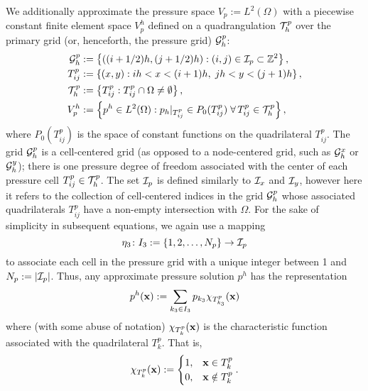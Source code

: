 We additionally approximate the pressure space $V_p := L^2(\Omega)$ with a piecewise constant finite element space $V_p^h$ defined on a quadrangulation $\mathcal{T}^p_h$ over the primary grid (or, henceforth, the pressure grid) $\mathcal{G}^p_h$:
\begin{align*}
\mathcal{G}^p_h & := \left\lbrace  ((i + 1/2)h, (j + 1/2)h) : (i,j) \in \mathcal{I}_p \subset \mathbb{Z}^2  \right\rbrace, \\
T^p_{ij} & := \left\lbrace  (x,y) : ih < x < (i+1)h, \; jh < y < (j+1)h  \right\rbrace, \\
\mathcal{T}^p_h & := \left\lbrace  T^p_{ij} : T^p_{ij} \cap \Omega \neq \emptyset  \right\rbrace, \\
V_p^h & := \left\lbrace  p^h \in L^2(\Omega) : p_h \rvert_{T^p_{ij}} \in P_0(T^p_{ij}) \; \forall \, T^p_{ij} \in \mathcal{T}^p_h  \right\rbrace,
\end{align*}
where $P_0(T^p_{ij})$ is the space of constant functions on the quadrilateral $T^p_{ij}$. The grid $\mathcal{G}^p_h$ is a cell-centered grid (as opposed to a node-centered grid, such as $\mathcal{G}^x_h$ or $\mathcal{G}^y_h$); there is one pressure degree of freedom associated with the center of each pressure cell $T^p_{ij}\in \mathcal{T}^p_h$. The set $\mathcal{I}_p$ is defined similarly to $\mathcal{I}_x$ and  $\mathcal{I}_y$, however here it refers to the collection of cell-centered indices in the grid $\mathcal{G}^p_h$ whose associated quadrilaterals $T^p_{ij}$ have a non-empty intersection with $\Omega$. For the sake of simplicity in subsequent equations, we again use a mapping
\begin{equation*}
\eta_3 \colon I_3 := \{ 1, 2, \dotsc, N_p \} \to \mathcal{I}_p
\end{equation*}
to associate each cell in the pressure grid with a unique integer between 1 and $N_p := \left\lvert \mathcal{I}_p \right\rvert$. Thus, any approximate pressure solution $p^h$ has the representation
\begin{equation} \label{eq:ch5.staggeredapproximation.p}
p^h(\mathbf{x}) := \sum_{k_3 \in I_3} p_{k_3} \chi_{T^p_{k_3}}(\mathbf{x})
\end{equation}
where (with some abuse of notation) $\chi_{T^p_k}(\mathbf{x})$ is the characteristic function associated with the quadrilateral $T^p_k$. That is,
\begin{equation*}
\chi_{T^p_k}(\mathbf{x}) := \begin{cases} 1, & \mathbf{x} \in T^p_k \\ 0, & \mathbf{x} \notin T^p_k \end{cases}.
\end{equation*}

